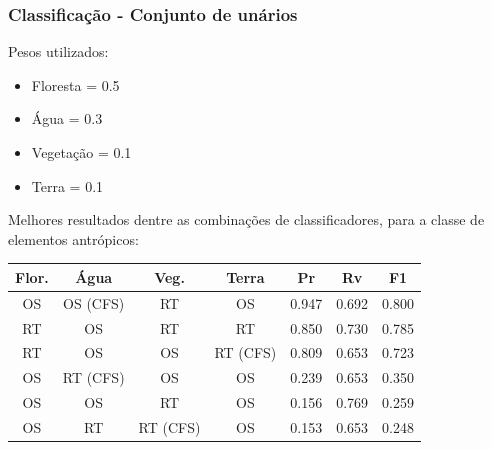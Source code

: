 \documentclass[t]{beamer}
\begin{document}
\begin{frame}[c]
	\frametitle{Classificação - Conjunto de unários}

	Pesos utilizados:
	\begin{itemize}
		\item Floresta = 0.5
		\item Água = 0.3
		\item Vegetação = 0.1
		\item Terra = 0.1
	\end{itemize}

	Melhores resultados dentre as combinações de classificadores, para a classe de elementos antrópicos:

	\small{
		\begin{table}[h]
		\centering
		\begin{tabulary}{\linewidth}{|C|C|C|C|C|C|C|}
		\hline
		\textbf{Flor.} & \textbf{Água} & \textbf{Veg.} & \textbf{Terra} & \textbf{Pr} & \textbf{Rv} & \textbf{F1} \\ \hline
		OS & OS (CFS) & RT       & OS       & 0.947 & 0.692 & 0.800 \\ \hline
		RT & OS       & RT       & RT       & 0.850 & 0.730 & 0.785 \\ \hline
		RT & OS       & OS       & RT (CFS) & 0.809 & 0.653 & 0.723 \\ \hline
		OS & RT (CFS) & OS       & OS       & 0.239 & 0.653 & 0.350 \\ \hline
		OS & OS       & RT       & OS       & 0.156 & 0.769 & 0.259 \\ \hline
		OS & RT       & RT (CFS) & OS       & 0.153 & 0.653 & 0.248 \\ \hline
		\end{tabulary}
		\end{table}
	}

\end{frame}
\end{document}
